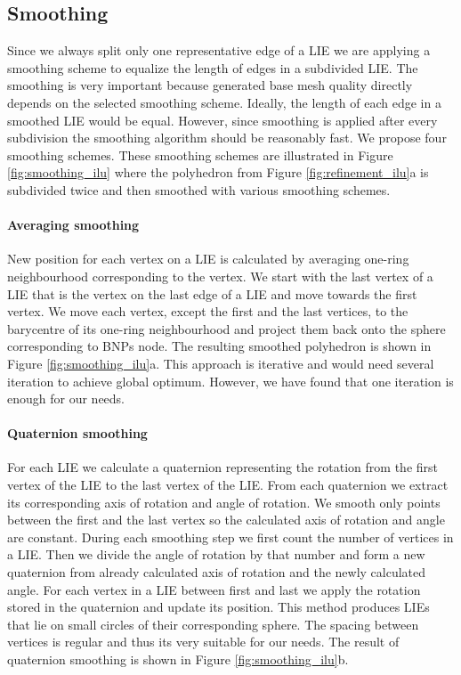 \subsection{Smoothing}
Since we always split only one representative edge of a LIE we are applying a smoothing scheme to equalize the length of edges in a subdivided LIE. The smoothing is very important because generated base mesh quality directly depends on the selected smoothing scheme. Ideally, the length of each edge in a smoothed LIE would be equal. However, since smoothing is applied after every subdivision the smoothing algorithm should be reasonably fast. We propose four smoothing schemes. These smoothing schemes are illustrated in Figure \ref{fig:smoothing_ilu} where the polyhedron from Figure \ref{fig:refinement_ilu}a is subdivided twice and then smoothed with various smoothing schemes.

\paragraph{Averaging smoothing}
New position for each vertex on a LIE is calculated by averaging one-ring neighbourhood corresponding to the vertex. We start with the last vertex of a LIE that is the vertex on the last edge of a LIE and move towards the first vertex. We move each vertex, except the first and the last vertices, to the barycentre of its one-ring neighbourhood and project them back onto the sphere corresponding to BNPs node. The resulting smoothed polyhedron is shown in Figure \ref{fig:smoothing_ilu}a. This approach is iterative and would need several iteration to achieve global optimum. However, we have found that one iteration is enough for our needs.

\paragraph{Quaternion smoothing}
For each LIE we calculate a quaternion representing the rotation from the first vertex of the LIE to the last vertex of the LIE. From each quaternion we extract its corresponding axis of rotation and angle of rotation. We smooth only points between the first and the last vertex so the calculated axis of rotation and angle are constant. During each smoothing step we first count the number of vertices in a LIE. Then we divide the angle of rotation by that number and form a new quaternion from already calculated axis of rotation and the newly calculated angle. For each vertex in a LIE between first and last we apply the rotation stored in the quaternion and update its position. This method produces LIEs that lie on small circles of their corresponding sphere. The spacing between vertices is regular and thus its very suitable for our needs. The result of quaternion smoothing is shown in Figure \ref{fig:smoothing_ilu}b.

